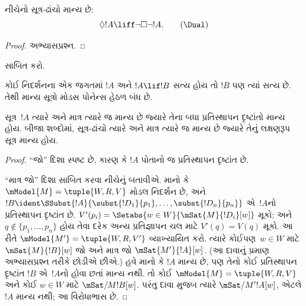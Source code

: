 \begin{prop}
  નીચેનો સૂત્ર-ઢાંચો \Dual{} માન્ય છે:
  \begin{equation*}
  \Diamond !A \liff \lnot\Box\lnot !A. \tag{\Dual}
  \end{equation*}
\end{prop}

\begin{proof}
  અભ્યાસપ્રશ્ન.
\end{proof}

\begin{prob}
   સાબિત કરો.
\end{prob}

\begin{prop}
  કોઈ નિદર્શનના એક જગતમાં $!A$ અને $!A \lif !B$
  સત્ય હોય તો $!B$ પણ ત્યાં સત્ય છે. તેથી માન્ય
  સૂત્રો મોડસ પોનેન્સ હેઠળ બંધ છે.
\end{prop}

\begin{prop}
  સૂત્ર~$!A$ ત્યારે અને માત્ર ત્યારે જ માન્ય છે
  જ્યારે તેના બધા પ્રતિસ્થાપન દૃષ્ટાંતો માન્ય હોય.
  બીજા શબ્દોમાં, સૂત્ર-ઢાંચો ત્યારે અને માત્ર ત્યારે જ
  માન્ય છે જ્યારે તેનું લક્ષણરૂપ સૂત્ર માન્ય હોય.
\end{prop}

\begin{proof}
  ``જો'' દિશા સ્પષ્ટ છે, કારણ કે $!A$ પોતાનો જ
  પ્રતિસ્થાપન દૃષ્ટાંત છે.

  ``માત્ર જો'' દિશા સાબિત કરવા નીચેનું બતાવીએ. માનો કે
  $\mModel{M} = \tuple{W, R, V}$ મોડલ નિદર્શન છે,
  અને $!B \ident
  \SSubst{!A}{\subst{!D_1}{p_1},\dots,\subst{!D_n}{p_n}}$
  એ~$!A$નો પ્રતિસ્થાપન દૃષ્ટાંત છે. $V'(p_i) =
  \Setabs{w \in W}{\mSat{M}{!D_i}[w]}$ મૂકો; અને
  $q \notin \{p_1,\dots,p_n\}$ હોય તેવા દરેક અન્ય
  પ્રતિજ્ઞાપન ચલ માટે $V'(q)=V(q)$ મૂકો.
  આ રીતે $\mModel{M'} = \tuple{W, R,V'}$ વ્યાખ્યાયિત કરો.
  ત્યારે કોઈપણ~$w \in W$ માટે
  $\mSat{M}{!B}[w]$ જો અને માત્ર જો $\mSat{M'}{!A}[w]$.
  (આ દાવાનું પ્રમાણ અભ્યાસપ્રશ્ન તરીકે છોડીએ છીએ.)
  હવે માનો કે $!A$ માન્ય છે, પણ તેનો કોઈ પ્રતિસ્થાપન
  દૃષ્ટાંત $!B$ એ~$!A$નો હોવા છતાં માન્ય નથી. તો કોઈ $\mModel{M} =
  \tuple{W, R, V}$ અને કોઈ $w \in W$ માટે
  $\mSat/{M}{!B}[w]$. પરંતુ દાવા મુજબ ત્યારે
  $\mSat/{M'}{!A}[w]$, એટલે $!A$ માન્ય નથી;
  આ વિરોધાભાસ છે.
\end{proof}

